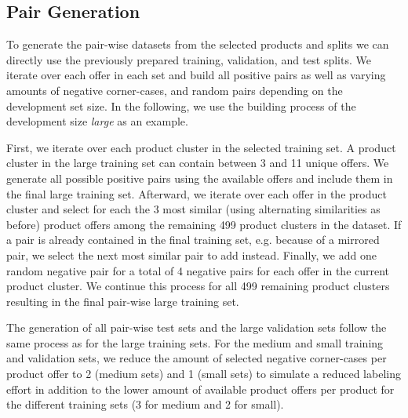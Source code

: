\documentclass[sigconf,edbt]{acmart-edbt2024}
\begin{document}
\subsection{Pair Generation}
\label{subsec:pairgen}

To generate the pair-wise datasets from the selected products and splits we can directly use the previously prepared training, validation, and test splits. We iterate over each offer in each set and build all positive pairs as well as varying amounts of negative corner-cases, and random pairs depending on the development set size. In the following, we use the building process of the development size \textit{large} as an example.

First, we iterate over each product cluster in the selected training set. A product cluster in the large training set can contain between 3 and 11 unique offers. We generate all possible positive pairs using the available offers and include them in the final large training set. Afterward, we iterate over each offer in the product cluster and select for each the 3 most similar (using alternating similarities as before) product offers among the remaining 499 product clusters in the dataset. If a pair is already contained in the final training set, e.g. because of a mirrored pair, we select the next most similar pair to add instead. Finally, we add one random negative pair for a total of 4 negative pairs for each offer in the current product cluster. We continue this process for all 499 remaining product clusters resulting in the final pair-wise large training set.

The generation of all pair-wise test sets and the large validation sets follow the same process as for the large training sets. For the medium and small training and validation sets, we reduce the amount of selected negative corner-cases per product offer to 2 (medium sets) and 1 (small sets) to simulate a reduced labeling effort in addition to the lower amount of available product offers per product for the different training sets (3 for medium and 2 for small). 
\end{document}
